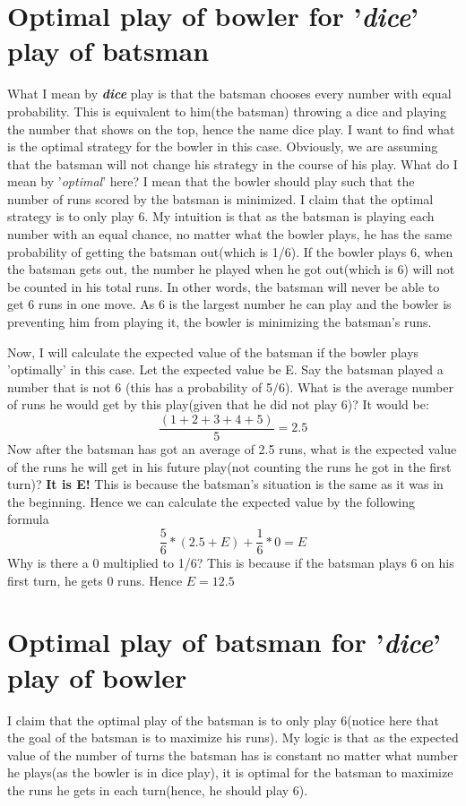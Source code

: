 \documentclass{article}
\begin{document}
\section {Optimal play of bowler for '\textit{dice}' play of batsman}
What I mean by \textit{\textbf{dice}} play is that the batsman chooses every number with equal probability. This is equivalent to him(the batsman) throwing a dice and playing the number that shows on the top, hence the name dice play. I want to find what is the optimal strategy for the bowler in this case. Obviously, we are assuming that the batsman will not change his strategy in the course of his play. 
What do I mean by '\textit{optimal}' here? I mean that the bowler should play such that the number of runs scored by the batsman is minimized.
I claim that the optimal strategy is to only play 6. My intuition is that as the batsman is playing each number with an equal chance, no matter what the bowler plays, he has the same probability of getting the batsman out(which is 1/6). If the bowler plays 6, when the batsman gets out, the number he played when he got out(which is 6) will not be counted in his total runs. In other words, the batsman will never be able to get 6 runs in one move. As 6 is the largest number he can play and the bowler is preventing him from playing it, the bowler is minimizing the batsman's runs.

Now, I will calculate the expected value of the batsman if the bowler plays 'optimally' in this case. Let the expected value be E. Say the batsman played a number that is not 6 (this has a probability of 5/6). What is the average number of runs he would get by this play(given that he did not play 6)? It would be:
$$\frac{(1 + 2 + 3 + 4 + 5)}{5} = 2.5$$
Now after the batsman has got an average of 2.5 runs, what is the expected value of the runs he will get in his future play(not counting the runs he got in the first turn)? \textbf{It is E!} This is because the batsman's situation is the same as it was in the beginning.
Hence we can calculate the expected value by the following formula
$$\frac{5}{6}*(2.5 + E) + \frac{1}{6}*0 = E$$
Why is there a 0 multiplied to 1/6? This is because if the batsman plays 6 on his first turn, he gets 0 runs.
Hence $E = 12.5$

\section {Optimal play of batsman for '\textit{dice}' play of bowler}
I claim that the optimal play of the batsman is to only play 6(notice here that the goal of the batsman is to maximize his runs). My logic is that as the expected value of the number of turns the batsman has is constant no matter what number he plays(as the bowler is in dice play), it is optimal for the batsman to maximize the runs he gets in each turn(hence, he should play 6).
\end{document}
